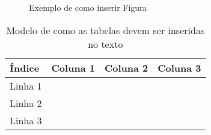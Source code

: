 
\begin{figure}[htb]
    \centering
    \caption{Exemplo de como inserir Figura}
    \label{fig:exemplo}
\end{figure}

\begin{table}[htb]
\caption{Modelo de como as tabelas devem ser inseridas no texto}
\label{tb:exemplo}
\centering
\begin{tabular}{|l|c|r|r|} %
\hline
Índice  & Coluna 1 & Coluna 2 & Coluna 3 \\
\hline
Linha 1 &          &          &          \\
Linha 2 &          &          &          \\
Linha 3 &          &          &          \\
\hline
\end{tabular}
\end{table}
